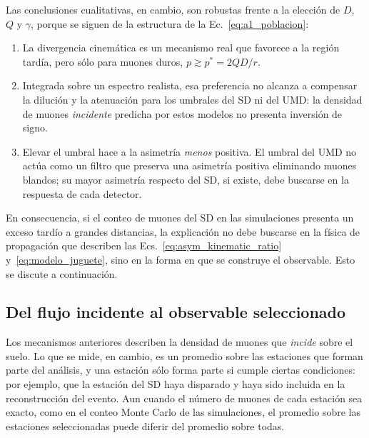 Las conclusiones cualitativas, en cambio, son robustas frente a la elección de $D$, $Q$ y $\gamma$, porque se siguen de la estructura de la Ec.~\ref{eq:a1_poblacion}:
\begin{enumerate}
	\item La divergencia cinemática es un mecanismo real que favorece a la región tardía, pero sólo para muones duros, $p\gtrsim p^* = 2QD/r$.
	\item Integrada sobre un espectro realista, esa preferencia no alcanza a compensar la dilución y la atenuación para los umbrales del SD ni del UMD: la densidad de muones \textit{incidente} predicha por estos modelos no presenta inversión de signo.
	\item Elevar el umbral hace a la asimetría \textit{menos} positiva. El umbral del UMD no actúa como un filtro que preserva una asimetría positiva eliminando muones blandos; su mayor asimetría respecto del SD, si existe, debe buscarse en la respuesta de cada detector.
\end{enumerate}
En consecuencia, si el conteo de muones del SD en las simulaciones presenta un exceso tardío a grandes distancias, la explicación no debe buscarse en la física de propagación que describen las Ecs.~\ref{eq:asym_kinematic_ratio} y~\ref{eq:modelo_juguete}, sino en la forma en que se construye el observable. Esto se discute a continuación.

\subsection{Del flujo incidente al observable seleccionado}
\label{subsec:respuesta_seleccion}

Los mecanismos anteriores describen la densidad de muones que \textit{incide} sobre el suelo. Lo que se mide, en cambio, es un promedio sobre las estaciones que forman parte del análisis, y una estación sólo forma parte si cumple ciertas condiciones: por ejemplo, que la estación del SD haya disparado y haya sido incluida en la reconstrucción del evento. Aun cuando el número de muones de cada estación sea exacto, como en el conteo Monte Carlo de las simulaciones, el promedio sobre las estaciones seleccionadas puede diferir del promedio sobre todas.

